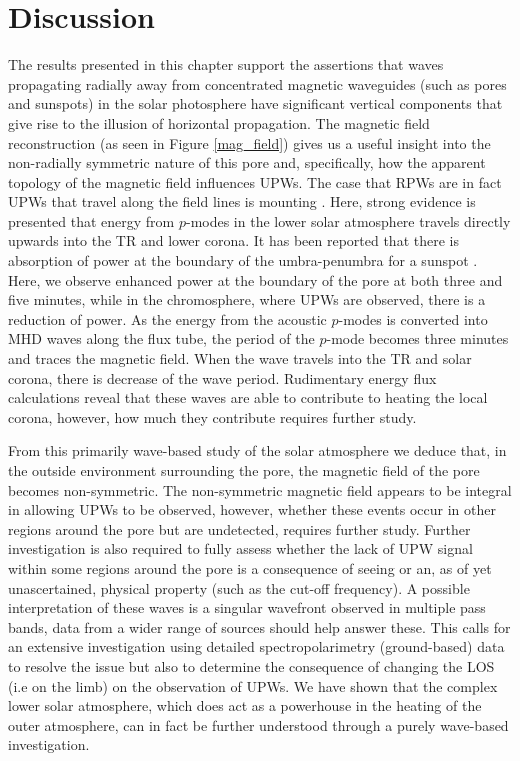 \section{Discussion}
\label{sect3}

	The results presented in this chapter support the assertions that waves propagating radially away from concentrated magnetic waveguides (such as pores and sunspots) in the solar photosphere have significant vertical components that give rise to the illusion of horizontal propagation.
	The magnetic field reconstruction (as seen in Figure \ref{mag_field}) gives us a useful insight into the non-radially symmetric nature of this pore and, specifically, how the apparent topology of the magnetic field influences UPWs.
	The case that RPWs are in fact UPWs that travel along the field lines is mounting \citep{Bloomfiel2008,Jess2013}.
	Here, strong evidence is presented that energy from $p$-modes in the lower solar atmosphere travels directly upwards into the TR and lower corona.
	It has been reported that there is absorption of power at the boundary of the umbra-penumbra for a sunspot \citep[e.g.][]{Gosain2011}.
	Here, we observe enhanced power at the boundary of the pore at both three and  five minutes, while in the chromosphere, where UPWs are observed, there is a reduction of power.
	As the energy from the acoustic $p$-modes is converted into MHD waves along the flux tube, the period of the $p$-mode becomes three minutes and traces the magnetic field.
	When the wave travels into the TR and solar corona, there is decrease of the wave period.
	Rudimentary energy flux calculations reveal that these waves are able to contribute to heating the local corona, however, how much they contribute requires further study.

	From this primarily wave-based study of the solar atmosphere we deduce that, in the outside environment surrounding the pore, the magnetic field of the pore becomes non-symmetric.
	The non-symmetric magnetic field appears to be integral in allowing UPWs to be observed, however, whether these events occur in other regions around the pore but are undetected, requires further study.
	Further investigation is also required to fully assess whether the lack of UPW signal within some regions around the pore is a consequence of seeing or an, as of yet unascertained, physical property (such as the cut-off frequency).
	A possible interpretation of these waves is a singular wavefront observed in multiple pass bands, data from a wider range of sources should help answer these.
	This calls for an extensive investigation using detailed spectropolarimetry (ground-based) data to resolve the issue but also to determine the consequence of changing the LOS (i.e on the limb) on the observation of UPWs.
	We have shown that the complex lower solar atmosphere, which does act as a powerhouse in the heating of the outer atmosphere, can in fact be further understood through a purely wave-based investigation.
